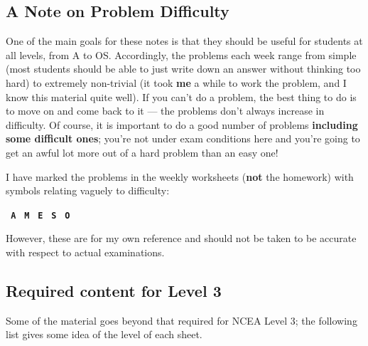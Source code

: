 \subsection*{A Note on Problem Difficulty}
One of the main goals for these notes is that they should be useful for students at all levels, from A to OS. Accordingly, the
problems each week range from simple (most students should be able to just write down an answer without thinking too hard) to
extremely non-trivial (it took \textbf{me} a while to work the problem, and I know this material quite well). If you can't do
a problem, the best thing to do is to move on and come back to it --- the problems don't always increase in difficulty. Of course,
it is important to do a good number of problems \textbf{including some difficult ones}; you're not under exam conditions here
and you're going to get an awful lot more out of a hard problem than an easy one!

I have marked the problems in the weekly worksheets (\textbf{not} the homework) with symbols relating vaguely to difficulty:

\begin{center}
\texttt{\textbf{\color{Cerulean} A}}
\texttt{\textbf{\color{PineGreen} M}}
\texttt{\textbf{\color{WildStrawberry} E}}
\texttt{\textbf{\color{Goldenrod} S}}
\texttt{\textbf{\color{BurntOrange} O}}
\end{center}

However, these are for my own reference and should not be taken to be accurate with respect to actual examinations.

\subsection*{Required content for Level 3}
Some of the material goes beyond that required for NCEA Level 3; the following list gives some idea of the level of each sheet.


